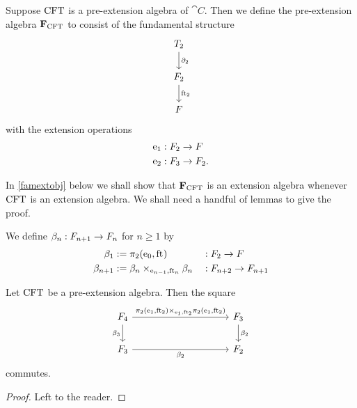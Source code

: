 \begin{defn}
Suppose $\mathrm{CFT}$ is a pre-extension algebra of $\cat{C}$. Then we define the pre-extension algebra
$\mathbf{F}_{\mathrm{CFT}}$ to consist of the fundamental structure
\begin{equation*}
\begin{tikzcd}
\stesyst_2
  \ar{d}{\ebd[2]}
  \\
\stesysf_2
  \ar{d}{\eft[2]}
  \\
\stesysf
\end{tikzcd}
\end{equation*}
with the extension operations
\begin{align*}
\mathrm{e}_{1} 
  & 
  : F_2\to F\\
\mathrm{e}_{2} & : F_3\to F_2.
\end{align*}
\end{defn}

In \autoref{famextobj} below we shall show that $\mathbf{F}_{\mathrm{CFT}}$ is an
extension algebra whenever $\mathrm{CFT}$ is an extension algebra. We shall need
a handful of lemmas to give the proof.

\begin{defn}
We define $\beta_n:F_{n+1}\to F_n$ for $n\geq 1$ by
\begin{align*}
\beta_1 
  & := 
\pullbackpr{2}{\ectxext}{\eft}
  & &
  : \stesysf_2\to\stesysf
  \\
\beta_{n+1}
  & :=
\pullback{\beta_n}{\beta_n}{\eext{n-1}}{\eft[n]}
  & &
  : \stesysf_{n+2}\to\stesysf_{n+1}
\end{align*}
\end{defn}

\begin{lem}
Let $\mathrm{CFT}$ be a pre-extension algebra. Then the square
\begin{equation*}
\begin{tikzcd}[column sep=10em]
\stesysf_4
  \ar{r}{\pullback{\pullbackpr{2}{\efamext}{\eft[2]}}{\pullbackpr{2}{\efamext}{\eft[2]}}{\efamext}{\eft[2]}}
  \ar{d}[swap]{\beta_3}
  &
\stesysf_3
  \ar{d}{\beta_2}
  \\
\stesysf_3
  \ar{r}[swap]{\beta_2}
  &
\stesysf_2
\end{tikzcd}
\end{equation*}
commutes.
\end{lem}

\begin{proof}
Left to the reader.
\end{proof}


